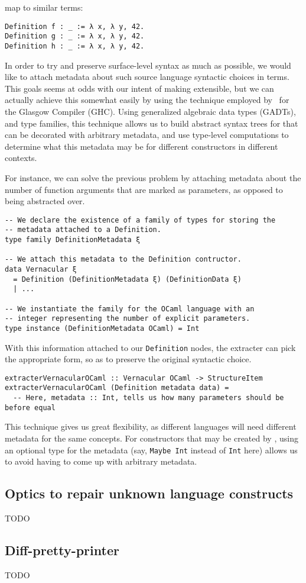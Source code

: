 map to similar \Chick{} terms:

\begin{verbatim}
Definition f : _ := λ x, λ y, 42.
Definition g : _ := λ x, λ y, 42.
Definition h : _ := λ x, λ y, 42.
\end{verbatim}

In order to try and preserve surface-level syntax as much as possible, we would
like to attach metadata about such source language syntactic choices in \Chick{}
terms.  This goals seems at odds with our intent of making \Coop{} extensible,
but we can actually achieve this somewhat easily by using the technique employed
by~ for the Glasgow \Haskell{} Compiler (GHC).  Using
generalized algebraic data types (GADTs), and type families, this technique
allows us to build abstract syntax trees for \Chick{} that can be decorated with
arbitrary metadata, and use type-level computations to determine what this
metadata may be for different constructors in different contexts.

For instance, we can solve the previous problem by attaching metadata about the
number of function arguments that are marked as parameters, as opposed to being
abstracted over.

\begin{verbatim}
-- We declare the existence of a family of types for storing the
-- metadata attached to a Definition.
type family DefinitionMetadata ξ

-- We attach this metadata to the Definition contructor.
data Vernacular ξ
  = Definition (DefinitionMetadata ξ) (DefinitionData ξ)
  | ...

-- We instantiate the family for the OCaml language with an
-- integer representing the number of explicit parameters.
type instance (DefinitionMetadata OCaml) = Int
\end{verbatim}

With this information attached to our \texttt{Definition} nodes,
the extracter can pick the appropriate form, so as to preserve the original
syntactic choice.

\begin{verbatim}
extracterVernacularOCaml :: Vernacular OCaml -> StructureItem
extracterVernacularOCaml (Definition metadata data) =
  -- Here, metadata :: Int, tells us how many parameters should be before equal
\end{verbatim}

This technique gives us great flexibility, as different languages will need
different metadata for the same concepts.  For constructors that may be created
by \Chick{}, using an optional type for the metadata (say,
\texttt{Maybe Int} instead of \texttt{Int} here)
allows us to avoid having to come up with arbitrary metadata.

\subsection{Optics to repair unknown language constructs}\label{optics}

TODO

\subsection{Diff-pretty-printer}

TODO
